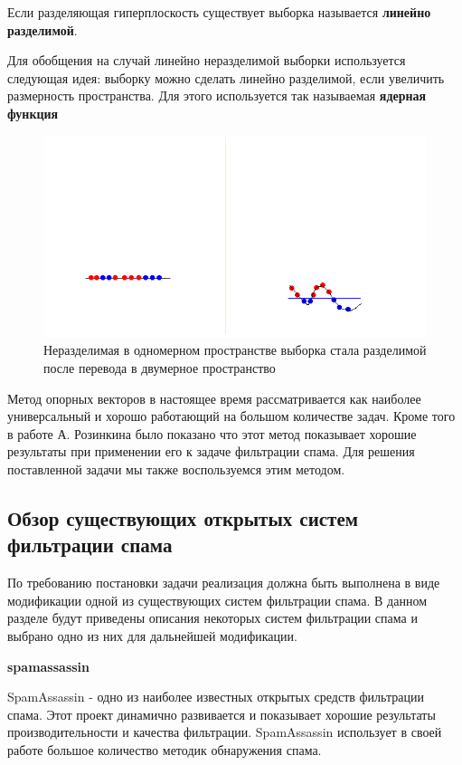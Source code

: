Если разделяющая гиперплоскость существует выборка называется \textbf{линейно разделимой}.

Для обобщения на случай линейно неразделимой выборки используется следующая идея: выборку можно сделать линейно разделимой, если увеличить размерность пространства. Для этого используется так называемая \textbf{ядерная функция}

\begin{figure}[h]
\begin{center}
\includegraphics[width=15cm]{img/svm2}
\end{center}
\caption{Неразделимая в одномерном пространстве выборка стала разделимой после перевода в двумерное пространство}
\label{svm-kernel}
\end{figure}

Метод опорных векторов в настоящее время рассматривается как наиболее универсальный и хорошо работающий на большом количестве задач. Кроме того в работе А. Розинкина было показано что этот метод показывает хорошие результаты при применении его к задаче фильтрации спама. Для решения поставленной задачи мы также воспользуемся этим методом.

\subsection{Обзор существующих открытых систем фильтрации спама}
По требованию постановки задачи реализация должна быть выполнена в виде модификации одной из существующих систем фильтрации спама. В данном разделе будут приведены описания некоторых систем фильтрации спама и выбрано одно из них для дальнейшей модификации. 

\textbf{spamassassin}

SpamAssassin - одно из наиболее известных открытых средств фильтрации спама. Этот проект динамично развивается и показывает хорошие результаты производительности и качества фильтрации. SpamAssassin использует в своей работе большое количество методик обнаружения спама.

